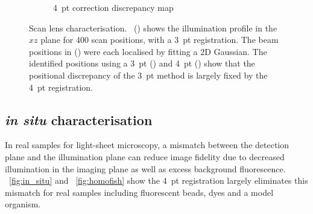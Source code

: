 \begin{figure}
\begin{subfigure}[t]{0.4\textwidth}
        \caption{4~pt correction discrepancy map}\label{fig:scan_lens/discrepancyHeatMap4pt_v2}
    \end{subfigure}
    \hfill
    \caption[Scan lens characterisation]{Scan lens characterisation. \figurename~() shows the illumination profile in the \(xz\) plane for 400 scan positions, %
    with a 3~pt registration.
    The beam positions in %
    () were each localised by fitting a \gls{2D} Gaussian.
    The identified positions %
    using a 3~pt () and 4~pt () %
    show that the positional discrepancy of the 3~pt method is largely fixed by the 4~pt registration.
    }\label{fig:scan_lens}
\end{figure}

\subsection{\emph{in situ} characterisation}

In real samples for
\gls{light-sheet} microscopy, %
a mismatch between the detection plane and the illumination plane %
can %
reduce image fidelity due to decreased illumination in the imaging plane as well as
excess background fluorescence.
\figurename~\ref{fig:in_situ} and \figurename~\ref{fig:homofish} show the 4~pt registration largely eliminates this %
mismatch for real samples including fluorescent beads, dyes and a model organism.


